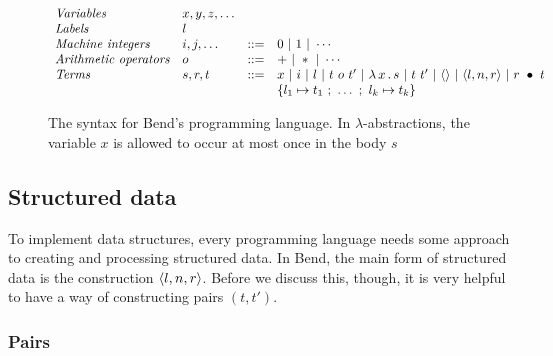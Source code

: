 \documentclass{article}
\begin{document}
\begin{figure}
  \[
  \begin{array}{llll}
    \textit{Variables}  & x,y,z,\ldots & \ &\ \\
    \textit{Labels}  & l & \ &\ \\ 
    \textit{Machine integers}  & i,j,\ldots & ::= & 0\ |\ 1\ | \ \cdots \\
    \textit{Arithmetic operators} & o & ::= & +\ |\ *\ |\ \cdots \\        
    \textit{Terms} & s,r,t & ::= & x\ |\ i\ |\ l\ |\ t\ o\ t'\ |\ \lam{x}{s}\ |\ t\ t'\ |\ \wunit\ |\ \ctor{l}{n}{r}\ |\ \wrec{r}{t} \\
    \ &\ &\ & \{ l_1 \mapsto t_1\ ;\ \ldots\ ;\ l_k\mapsto t_k \}
  \end{array}
\]
\caption{The syntax for Bend's programming language.  In $\lambda$-abstractions, the variable $x$ is allowed
  to occur at most once in the body $s$}
\label{fig:pl}
\end{figure}

\subsection{Structured data}

To implement data structures, every programming language needs some
approach to creating and processing structured data.  In Bend, the
main form of structured data is the construction $\langle l , n, r \rangle$.
Before we discuss this, though, it is very helpful to have a way of
constructing pairs $(t,t')$.

\subsubsection{Pairs}
\end{document}
